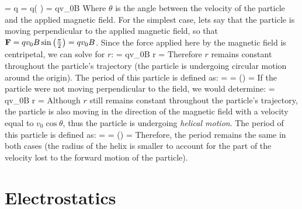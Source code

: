 \be
\bF = q \left[ \bE + \bv \times \bB\right] \thus \bF = q\left( \bv \times \bB \right) = qv_0B\sin{\theta}
\ee
Where $\theta$ is the angle between the velocity of the particle and the applied magnetic field. For the simplest case, lets say that the particle is moving perpendicular to the applied magnetic field, so that ${\bf F} = qv_0B\sin{\left(\frac{\pi}{2}\right)} = qv_0B$. Since the force applied here by the magnetic field is centripetal, we can solve for $r$:
\be
{} = qv_0B \thus r = 
\ee
Therefore $r$ remains constant throughout the particle's trajectory (the particle is undergoing circular motion around the origin). The period of this particle is defined as:
\be
\tau =  =  \left(\right) = 
\ee
If the particle were not moving perpendicular to the field, we would determine:
\be
{} = qv_0B\sin{\theta} \thus r = 
\ee
Although $r$ still remains constant throughout the particle's trajectory, the particle is also moving in the direction of the magnetic field with a velocity equal to $v_0\cos{\theta}$, thus the particle is undergoing \textit{helical motion}. The period of this particle is defined as:
\be
\tau =  =  \left(\right) = 
\ee
Therefore, the period remains the same in both cases (the radius of the helix is smaller to account for the part of the velocity lost to the forward motion of the particle).
\enu
\newpage
\part{Electrostatics}
\newpage

